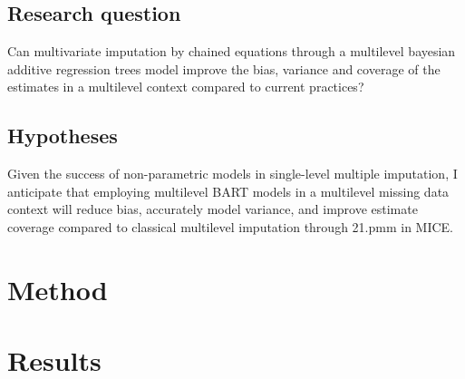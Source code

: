 \documentclass[10pt, a4paper, titlepage]{article}
\begin{document}
\subsection{Research question}
Can multivariate imputation by chained equations through a multilevel bayesian additive regression trees model improve the bias, variance and coverage of the estimates in a multilevel context compared to current practices?

\subsection{Hypotheses}
Given the success of non-parametric models in single-level multiple imputation, I anticipate that employing multilevel BART models in a multilevel missing data context will reduce bias, accurately model variance, and improve estimate coverage compared to classical multilevel imputation through 21.pmm in MICE.

\section{Method}


\section{Results}

\newpage


\end{document}
